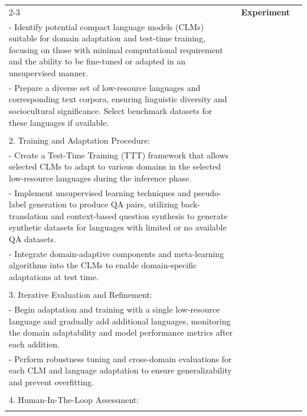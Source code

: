 \documentclass[11pt]{article}
\begin{document}
\begin{center}
\begin{longtable}{p{}p{}p{}}
{} \\
\cline{2-3}
& \multicolumn{1}{p{.08\textwidth}}{\textbf{Experiment}} & 
\makecell{ 
    \multicolumn{1}{p{.75\textwidth}}{1. Selection and Preparation:} \\
    \multicolumn{1}{p{.75\textwidth}}{- Identify potential compact language models (CLMs) suitable for domain adaptation and test-time training, focusing on those with minimal computational requirement and the ability to be fine-tuned or adapted in an unsupervised manner.} \\
    \multicolumn{1}{p{.75\textwidth}}{- Prepare a diverse set of low-resource languages and corresponding text corpora, ensuring linguistic diversity and sociocultural significance. Select benchmark datasets for these languages if available.} \\ \\
    \multicolumn{1}{p{.75\textwidth}}{2. Training and Adaptation Procedure:} \\
    \multicolumn{1}{p{.75\textwidth}}{- Create a Test-Time Training (TTT) framework that allows selected CLMs to adapt to various domains in the selected low-resource languages during the inference phase.} \\
    \multicolumn{1}{p{.75\textwidth}}{- Implement unsupervised learning techniques and pseudo-label generation to produce QA pairs, utilizing back-translation and context-based question synthesis to generate synthetic datasets for languages with limited or no available QA datasets.} \\
    \multicolumn{1}{p{.75\textwidth}}{- Integrate domain-adaptive components and meta-learning algorithms into the CLMs to enable domain-specific adaptations at test time.
} \\ \\
    \multicolumn{1}{p{.75\textwidth}}{3. Iterative Evaluation and Refinement:} \\
    \multicolumn{1}{p{.75\textwidth}}{- Begin adaptation and training with a single low-resource language and gradually add additional languages, monitoring the domain adaptability and model performance metrics after each addition.} \\ 
    \multicolumn{1}{p{.75\textwidth}}{- Perform robustness tuning and cross-domain evaluations for each CLM and language adaptation to ensure generalizability and prevent overfitting.} \\ \\
    \multicolumn{1}{p{.75\textwidth}}{4. Human-In-The-Loop Assessment:} \\
}
\end{longtable}
\end{center}
\end{document}
